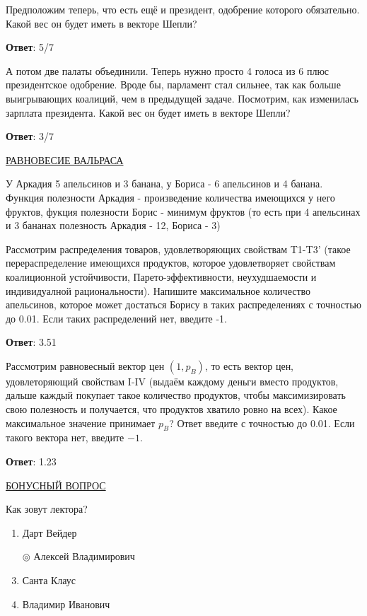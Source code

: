 \task
Предположим теперь, что есть ещё и президент, одобрение которого обязательно. Какой вес он будет иметь в векторе Шепли?

\textbf{Ответ}: 
5/7 %

\task
А потом две палаты объединили. Теперь нужно просто 4 голоса из 6 плюс президентское одобрение. Вроде бы, парламент стал сильнее, так как больше выигрывающих коалиций, чем в предыдущей задаче. Посмотрим, как изменилась зарплата президента. Какой вес он будет иметь в векторе Шепли?

\textbf{Ответ}: 
3/7  %

\task
\underline{РАВНОВЕСИЕ ВАЛЬРАСА}

У Аркадия 5 апельсинов и 3 банана, у Бориса - 6 апельсинов и 4 банана. Функция полезности Аркадия - произведение количества имеющихся у него фруктов, фукция полезности Борис - минимум фруктов (то есть при 4 апельсинах и 3 бананах полезность Аркадия - 12, Бориса - 3)

Рассмотрим распределения товаров, удовлетворяющих свойствам T1-T3' (такое перераспределение имеющихся продуктов, которое удовлетворяет свойствам коалиционной устойчивости, Парето-эффективности, неухудшаемости и индивидуалной рациональности). Напишите максимальное количество апельсинов, которое может достаться Борису в таких распределениях с точностью до 0.01. Если таких распределений нет, введите -1.

\textbf{Ответ}: 
3.51

\task
Рассмотрим равновесный вектор цен $(1,p_B)$, то есть вектор цен, удовлеторяющий свойствам I-IV (выдаём каждому деньги вместо продуктов, дальше каждый покупает такое количество продуктов, чтобы максимизировать свою полезность и получается, что продуктов хватило ровно на всех). Какое максимальное значение принимает $p_B$? Ответ введите с точностью до 0.01. Если такого вектора нет, введите $-1$.

\textbf{Ответ}: 
1.23

\task
\underline{БОНУСНЫЙ ВОПРОС}

Как зовут лектора?

\begin{enumerate}[label=$\circ$]
	\item Дарт Вейдер
	\item[$\circledcirc$] Алексей Владимирович
	\item Санта Клаус
	\item Владимир Иванович
\end{enumerate}